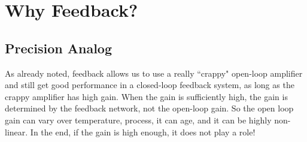 \section{Why Feedback?}
\subsection{Precision Analog}
As already noted, feedback allows us to use a really ``crappy" open-loop amplifier and still get good performance in a closed-loop feedback system, as long as the crappy amplifier has high gain.  When the gain is sufficiently high, the gain is determined by the feedback network, not the open-loop gain.  So the open loop gain can vary over temperature, process, it can age, and it can be highly non-linear.  In the end, if the gain is high enough, it does not play a role!

